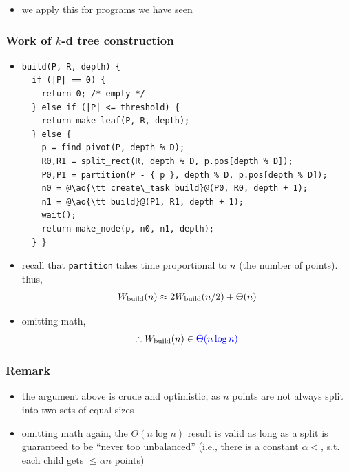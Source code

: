 \documentclass[12pt,dvipdfmx]{beamer}
\newcommand{\ao}[1]{{\color{blue}#1}}
\newcommand{\aka}[1]{{\color{red}#1}}
\begin{document}
\begin{frame}[fragile]
\begin{itemize}
\begin{columns}
\begin{column}{0.3\textwidth}
\begin{center}
\end{center}
    \end{column}
  \end{columns}
then
\begin{itemize}
\item (work)
\aka{$W_{\mbox{f}}(n) \leq W_{\mbox{g}}(n) + W_{\mbox{f}}(n/3) + W_{\mbox{f}}(2n/3)$}
\item (critical path)
\ao{$C_{\mbox{f}}(n) \leq C_{\mbox{g}}(n) + \max \{ C_{\mbox{f}}(n/3), C_{\mbox{f}}(2n/3) \}$}
\end{itemize}

\item we apply this for programs we have seen
\end{itemize}
\end{frame}


\begin{frame}[fragile]
\frametitle{Work of $k$-d tree construction}
\begin{itemize}
\item []
\begin{lstlisting}
build(P, R, depth) {
  if (|P| == 0) {
    return 0; /* empty */
  } else if (|P| <= threshold) {
    return make_leaf(P, R, depth);
  } else {
    p = find_pivot(P, depth % D);
    R0,R1 = split_rect(R, depth % D, p.pos[depth % D]);
    P0,P1 = partition(P - { p }, depth % D, p.pos[depth % D]);
    n0 = @\ao{\tt create\_task build}@(P0, R0, depth + 1);
    n1 = @\ao{\tt build}@(P1, R1, depth + 1);
    wait();
    return make_node(p, n0, n1, depth);
  } }
\end{lstlisting}

\item []
  recall that {\tt partition}
  takes time proportional to $n$ (the number of points). thus, 
\[
\begin{array}{l}
W_{\mbox{\scriptsize build}}(n)
\approx 2W_{\mbox{\scriptsize build}}(n/2) + \Theta(n) \\
\end{array}
\]

\item [] omitting math,
\[ \therefore W_{\mbox{\scriptsize build}}(n) \in \ao{\Theta(n \log n)} \]
\end{itemize}
\end{frame}

\begin{frame}
\frametitle{Remark}
\begin{itemize}
\item the argument above is crude and optimistic, as $n$
  points are not always split into two sets of
  equal sizes

\item omitting math again, the $\Theta(n \log n)$ result is valid as
  long as a split is guaranteed to be ``never too
  unbalanced'' (i.e., there is a constant $\alpha
  < $, s.t. each child gets $\leq \alpha n$
  points)
\end{itemize}
\end{frame}
\end{document}
